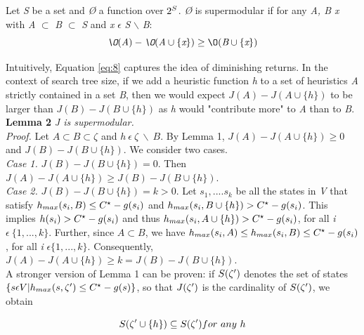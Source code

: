 \documentclass[11pt,a4paper,oneside]{report}
\begin{document}
Let \textit{S} be a set and \textit{{\O}} a function over $2\sp{S}$. \textit{{\O}} is supermodular if for any \textit{A, B x} with \textit{A} $\subset$ \textit{B} $\subset$ \textit{S} and \textit{x} $\epsilon$ \textit{S} $\backslash$ \textit{B}:\\

\begin{equation}
\label{eq:8}
\textit{{\O}}(\textit{A}) - \textit{{\O}}(\textit{A} \cup \{\textit{x}\}) \geq {\O}(\textit{B} \cup \{\textit{x}\})
\end{equation}

Intuitively, Equation \ref{eq:8} captures the idea of diminishing returns. In the context of  search tree size, if we add a heuristic function \textit{h} to a set of heuristics \textit{A} strictly contained in a set \textit{B}, then we would expect $J(A) - J(A \cup \{h\})$ to be larger than $J(B) - J(B \cup \{h\})$ as \textit{h} would "contribute more" to \textit{A} than to \textit{B}.\\

\textbf{Lemma 2} \textit{J is supermodular.}  \\
\textit{Proof.} Let $A \subset B  \subset \zeta$ and $h \ \epsilon \ \zeta \ \backslash \ B$. By Lemma 1,  $J(A) - J(A \cup \{h\}) \geq 0$ and $J(B) - J(B \cup \{h\})$. We consider two cases.\\
\textit{Case 1.} $J(B) - J(B \cup \{h\}) = 0$. Then $J(A) - J(A \cup \{h\}) \geq J(B) - J(B \cup \{h\})$.\\
\textit{Case 2.} $J(B) - J(B \cup \{h\}) = k > 0$. Let $s_1,....s_k$ be all the states in \textit{V} that satisfy $h_{\substack{max}}(s_i, B) \leq C\sp{\star} - g(s_i)$ and $h_{\substack{max}}(s_i, B \cup \{h\}) > C\sp{\star} - g(s_i)$. This implies $h(s_i) > C\sp{\star} - g(s_i)$ and thus $h_{\substack{max}}(s_i, A \cup \{h\}) > C\sp{\star} - g(s_i)$, for all \textit{i} $\epsilon \ \{1,...,k\}$. Further, since $A \subset B$, we have $h_{\substack{max}}(s_i, A) \leq h_{\substack{max}}(s_i, B) \leq C\sp{\star} - g(s_i)$, for all \textit{i} $\epsilon \{1,...,k\}$. Consequently, $J(A) - J(A \cup \{h\}) \geq k = J(B) - J(B \cup \{h\})$.\\

A stronger version of Lemma 1 can be proven: if $S(\zeta\sp{\prime})$ denotes the set of states $\{ s \epsilon V | h_{\substack{max}}(s, \zeta\sp{\prime}) \leq C\sp{\star} - g(s)\}$, so that $J(\zeta\sp{\prime})$ is the cardinality of $S(\zeta\sp{\prime})$, we obtain

\begin{equation}
\label{eq:9}
S(\zeta\sp{\prime} \cup \{h\}) \subseteq S(\zeta\sp{\prime}) for\  any\  h
\end{equation}
\end{document}
